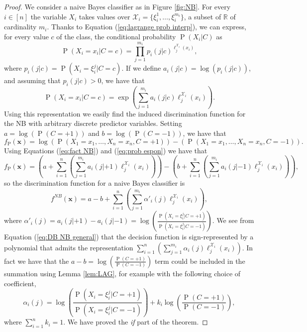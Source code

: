 \documentclass[11pt,a4paper, twoside]{book}
\newcommand{\Pp}{\operatorname{P}}
\newcommand{\bx}{\mathbf{x}}
\newcommand{\nchi}{\mathcal{X}}
\begin{document}
\begin{proof}
We consider a naive Bayes classifier as in Figure \ref{fig:NB}. For every $i \in [n]$ the variable $X_i$ takes values over $\nchi_i=\{\xi_i^1,\ldots,\xi_i^{m_i}\}$,  a subset of $\mathbb{R}$ of cardinality $m_i$.
Thanks to Equation (\ref{eq:lagrange prob interp}), we can express, for every value $c$ of the class, the conditional probability $\Pp(X_i | C)$ as 
\[ \Pp(X_i=x_i | C=c)=\prod_{j=1}^{m_i} p_{i}(j|c)^{\ell ^{\nchi_i} _j(x_i)} , \]
where $p_{i}(j|c)=\Pp(X_i=\xi_i^j|C=c)$.
If we define $a_{i}(j|c)=\log ( p_{i}(j|c) )$, and assuming that $p_{i}(j|c)> 0$, we have that
\begin{equation}
\label{eq:prob espon}
 \Pp(X_i=x_i | C=c)=\exp \left( \sum_{j=1}^{m_i} a_{i}(j|c)\ell ^{\nchi_i} _j(x_i)\right). 
 \end{equation}
Using this representation we easily find the induced discrimination function for the NB with arbitrary discrete predictor variables.
Setting $a=\log ( \Pp(C=+1) ) $ and $b=\log ( \Pp(C=-1) ) $, we have that 
\[ f_{\Pp}(\bx)= \log\left(\Pp(X_1=x_1,\ldots,X_n=x_n,C=+1)\right)- \left(\Pp(X_1=x_1,\ldots,X_n=x_n,C=-1)\right) . \]
Using Equations (\ref{eq:fact NB}) and (\ref{eq:prob espon}) we have that 
\[  f_{\Pp}(\bx)= \left( a+ \sum_{i=1}^n \left( \sum_{j=1}^{m_i}  a_{i}(j|+1)\ell ^{\nchi_i} _j(x_i) \right) \right) -  \left( b+ \sum_{i=1}^n \left( \sum_{j=1}^{m_i}  a_{i}(j|-1)\ell ^{\nchi_i} _j(x_i) \right) \right) , 
\]
so the discrimination function for a naive Bayes classifier is  
\begin{equation}
\label{eq:DB NB general}
f^{NB}(\mathbf{x})= a-b + \sum_{i=1}^n \left( \sum_{j=1}^{m_i} \alpha'_{i}(j)\ell ^{\nchi_i} _j(x_i) \right)  ,
\end{equation}
where ${\alpha'}_{i}(j)=a_{i}(j|+1)-a_{i}(j|-1)=\log \left( \frac{\Pp(X_i=\xi_i^j|C=+1)}{\Pp(X_i=\xi_i^j|C=-1)} \right)$.
We see from Equation (\ref{eq:DB NB general}) that the decision function is sign-represented by a polynomial that admits the representation $\sum_{i=1}^n \left( \sum_{j=1}^{m_i}  \alpha_{i}(j)\ell ^{\nchi_i} _j(x_i) \right)$. {In fact we have that the $a-b=\log\left(\frac{\Pp(C=+1)}{\Pp(C=-1)}\right)$ term could be included in the summation using Lemma \ref{lem:LAG}, for example with the following choice of coefficient},
\begin{equation}
{
\alpha_{i}(j)=\log \left( \frac{\Pp(X_i=\xi_i^j|C=+1)}{\Pp(X_i=\xi_i^j|C=-1)} \right)+k_i\log \left( \frac{\Pp(C=+1)}{\Pp(C=-1)} \right),}
\label{eq:coefalpha}
\end{equation} 
{where $\sum_{i=1}^n k_i=1$.}
We have proved the \textit{if} part of the theorem.  


\end{proof}
\end{document}
